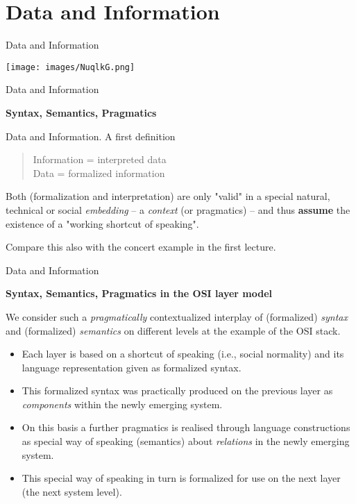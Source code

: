\documentclass{beamer}
\newcommand{\ueberschrift}[1]{\begin{center}\bf #1\end{center}}
\begin{document}
\section{Data and Information}
\begin{frame}{Data and Information}

  \begin{center}
    \texttt{[image: images/NuqlkG.png]}
  \end{center}
\end{frame}

\begin{frame}{Data and Information}

  \ueberschrift{Syntax, Semantics, Pragmatics}
  
  \begin{block}{Data and Information. A first definition}
    \begin{quote}
      Information = interpreted data\\
      Data = formalized information
    \end{quote}
  \end{block}

Both (formalization and interpretation) are only "valid" in a special natural,
technical or social \emph{embedding} -- a \emph{context} (or pragmatics) --
and thus \textbf{assume} the existence of a "working shortcut of speaking".

Compare this also with the concert example in the first lecture.
\vfill
\end{frame}
\begin{frame}{Data and Information}

  \ueberschrift{Syntax, Semantics, Pragmatics in the OSI layer model}

We consider such a \emph{pragmatically} contextualized interplay of
(formalized) \emph{syntax} and (formalized) \emph{semantics} on different
levels at the example of the OSI stack.

\begin{itemize}
\item Each layer is based on a shortcut of speaking (i.e., social normality)
  and its language representation given as formalized syntax.
\item This formalized syntax was practically produced on the previous layer
  as \emph{components} within the newly emerging system.
\item On this basis a further pragmatics is realised through language
  constructions as special way of speaking (semantics) about \emph{relations}
  in the newly emerging system.
\item This special way of speaking in turn is formalized for use on the next
  layer (the next system level).
\end{itemize}\bigskip
\end{frame}
\end{document}
